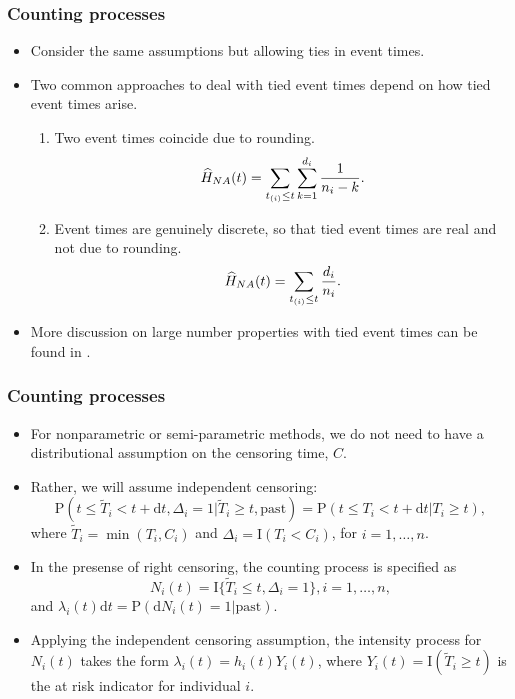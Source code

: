 \documentclass[10pt]{beamer}\usepackage[]{graphicx}\usepackage[]{color}
\newcommand{\dif}{\mathrm{d}}
\newcommand{\I}{\mathrm{I}}
\newcommand{\p}{\mathrm{P}}
\newcommand{\Hna}{\widehat{H}_{\scriptsize{NA}}}
\begin{document}
\begin{frame}
  \frametitle{Counting processes}
  \begin{itemize}  
  \item Consider the same assumptions but allowing ties in event times.
  \item Two common approaches to deal with tied event times depend on how tied event times arise.
    \begin{enumerate}
    \item Two event times coincide due to rounding. 
      $$\Hna(t) = \sum_{t_{(i)}\le t}\sum_{k = 1}^{d_i}\frac{1}{n_i - k}.$$
    \item Event times are genuinely discrete, so that tied event times are real
      and not due to rounding.
      $$\Hna(t) = \sum_{t_{(i)}\le t}\frac{d_i}{n_i}.$$
    \end{enumerate}
  \item More discussion on large number properties with tied event times can be found in 
    \citet{anderson1993statistical}.
  \end{itemize}
\end{frame} 


\begin{frame}
  \frametitle{Counting processes}
  \begin{itemize}  
  \item For nonparametric or semi-parametric methods, 
    we do not need to have a distributional assumption on the censoring time, $C$.
  \item Rather, we will assume independent censoring:
    $$\p(t \le \tilde{T}_i < t + \dif t, \Delta_i = 1|\tilde{T}_i\ge t, \mbox{past}) = 
    \p(t\le T_i<t + \dif t|T_i\ge t),$$
    where $\tilde{T}_i = \min(T_i, C_i)$ and $\Delta_i = \I(T_i < C_i)$, for $i = 1, \ldots, n$.
  \item In the presense of right censoring, the counting process is specified as
    $$ N_i(t) = \I\{\tilde{T}_i\le t, \Delta_i = 1\}, i = 1, \ldots, n, $$
    and $\lambda_i(t)\dif t = \p(\dif N_i(t) = 1|\mbox{past})$. 
  \item Applying the independent censoring assumption, 
    the intensity process for $N_i(t)$ takes the form $\lambda_i(t) = h_i(t) Y_i(t)$, where
    $Y_i(t) = \I(\tilde{T}_i\ge t)$ is the at risk indicator for individual $i$.
  \end{itemize}
\end{frame} 
\end{document}
